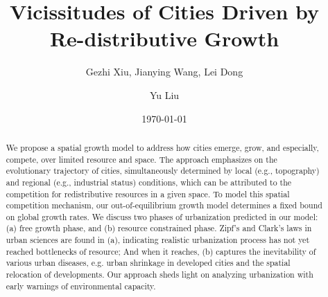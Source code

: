 \documentclass[reprint,unsortedaddress,amsmath,amssymb,aps,prl,showkeys]{revtex4-2}
\begin{document}
\title{Vicissitudes of Cities Driven by Re-distributive Growth}
\author{Gezhi Xiu, Jianying Wang, Lei Dong}
\author{Yu Liu}
\date{\today}

\begin{abstract}
	We propose a spatial growth model to address how cities emerge, grow, and especially, compete, over limited resource and space. The approach emphasizes on the evolutionary trajectory of cities, simultaneously determined by local (e.g., topography) and regional (e.g., industrial status) conditions, which can be attributed to the competition for redistributive resources in a given space. To model this spatial competition mechanism, our out-of-equilibrium growth model determines a fixed bound on global growth rates. We discuss two phases of urbanization predicted in our model: (a) free growth phase, and (b) resource constrained phase. Zipf's and Clark's laws in urban sciences are found in (a), indicating realistic urbanization process has not yet reached bottlenecks of resource; And when it reaches, (b) captures the inevitability of various urban diseases, e.g. urban shrinkage in developed cities and the spatial relocation of developments. Our approach sheds light on analyzing urbanization with early warnings of environmental capacity.
\end{abstract}
\maketitle
\end{document}
